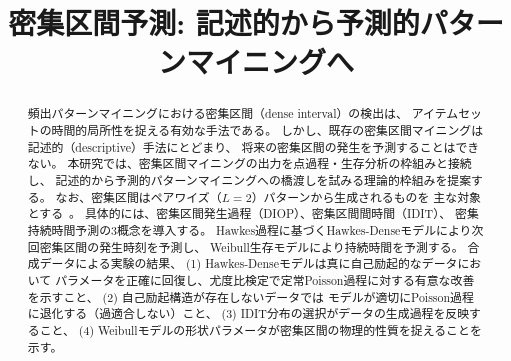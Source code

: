 \documentclass[11pt,a4paper]{article}
\title{密集区間予測: 記述的から予測的パターンマイニングへ}
\author{}
\date{}
\begin{document}
\maketitle

\begin{abstract}
頻出パターンマイニングにおける密集区間（dense interval）の検出は、
アイテムセットの時間的局所性を捉える有効な手法である。
しかし、既存の密集区間マイニングは記述的（descriptive）手法にとどまり、
将来の密集区間の発生を予測することはできない。
本研究では、密集区間マイニングの出力を点過程・生存分析の枠組みと接続し、
記述的から予測的パターンマイニングへの橋渡しを試みる理論的枠組みを提案する。
なお、密集区間はペアワイズ（$L=2$）パターンから生成されるものを
主な対象とする~\cite{lancaster2018surges}。
具体的には、密集区間発生過程（DIOP）、密集区間間時間（IDIT）、
密集持続時間予測の3概念を導入する。
Hawkes過程に基づくHawkes-Denseモデルにより次回密集区間の発生時刻を予測し、
Weibull生存モデルにより持続時間を予測する。
合成データによる実験の結果、
(1) Hawkes-Denseモデルは真に自己励起的なデータにおいて
パラメータを正確に回復し、尤度比検定で定常Poisson過程に対する有意な改善を示すこと、
(2) 自己励起構造が存在しないデータでは
モデルが適切にPoisson過程に退化する（過適合しない）こと、
(3) IDIT分布の選択がデータの生成過程を反映すること、
(4) Weibullモデルの形状パラメータが密集区間の物理的性質を捉えることを示す。
\end{abstract}










\end{document}
